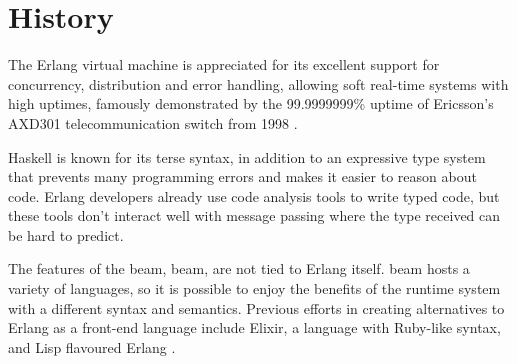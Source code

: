 

\section{History}

The Erlang virtual machine is appreciated for its excellent support for concurrency, distribution and error handling, allowing soft real-time systems with high uptimes, famously demonstrated by the 99.9999999\% uptime of Ericsson’s AXD301 telecommunication switch from 1998 \cite{ninenines}.

Haskell is known for its terse syntax, in addition to an expressive type system that prevents many programming errors and makes it easier to reason about code. Erlang developers already use code analysis tools to write typed code, but these tools don’t interact well with message passing where the type received can be hard to predict.

The features of the \gls{beam}, \glsdesc{beam}, are not tied to Erlang itself. \Gls{beam} hosts a variety of languages, so it is possible to enjoy the benefits of the runtime system with a different syntax and semantics. Previous efforts in creating alternatives to Erlang as a front-end language include Elixir\cite{elixir}, a language with Ruby-like syntax, and Lisp flavoured Erlang \cite{lfe}.
